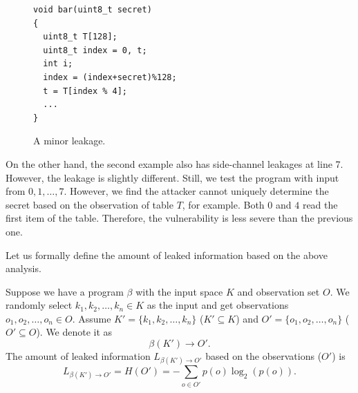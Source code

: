 \begin{figure}[h]
  \begin{minipage}{0.49\linewidth}
    \begin{lstlisting}[xleftmargin=.05\textwidth,xrightmargin=.08\textwidth]
void bar(uint8_t secret)
{
  uint8_t T[128];
  uint8_t index = 0, t;
  int i;
  index = (index+secret)%128;
  t = T[index % 4];
  ...
}
\end{lstlisting}
  \end{minipage}
  \hfill
  \begin{minipage}{0.42\linewidth}
  \end{minipage}
  \caption{A minor leakage. }\label{chapter5:fig:example2}
\end{figure}
On the other hand, the second example also has side-channel leakages at line 7. However, the leakage is slightly different. Still, we test the program with input from $0, 1, \dots, 7$. However, we find the attacker cannot uniquely determine the secret based on the observation of table $T$, for example. Both $0$ and $4$ read the first item of the table. Therefore, the vulnerability is less severe than the previous one.

Let us formally define the amount of leaked information based on the above analysis.

\begin{mydef}
  \label{chapter5:def}
    Suppose we have a program $\beta$ with the input space $K$ and observation set $O$. We randomly select $k_1, k_2, \ldots, k_n \in K$ as the input and get observations $o_1, o_2, \ldots, o_n \in O$. Assume $K'=\{k_1, k_2, \ldots, k_n\}$  ($K' \subseteq K$) and
    $O'=\{o_1, o_2, \ldots, o_n\}$  ($O' \subseteq O$).
    We denote it as
    $$\beta(K') \rightarrow	O'.$$
    The amount of leaked information $L_{\beta(K')\rightarrow O'}$ based on the observations ($O'$) is
    $$L_{\beta(K')\rightarrow O'} = H(O') = - \sum_{o {\in} O'}p(o)\log_2(p(o)). $$
\end{mydef}


